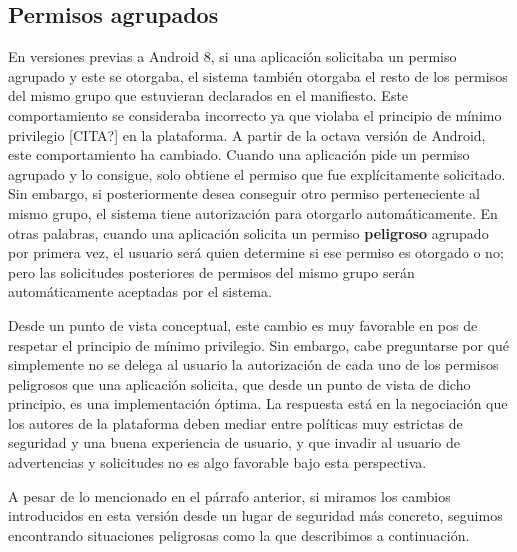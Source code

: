 \subsection{Permisos agrupados}
\label{subsection:recent-changes:grouped-permissions}
En versiones previas a Android 8, si una aplicación solicitaba un permiso agrupado y este se otorgaba, el
sistema también otorgaba el resto de los permisos del mismo grupo que estuvieran declarados en el
manifiesto. Este comportamiento se consideraba incorrecto ya que violaba el principio de mínimo
privilegio [CITA?] en la plataforma. A partir de la octava versión de Android, este comportamiento ha
cambiado. Cuando una aplicación pide un permiso agrupado y lo consigue, solo obtiene el permiso que fue
explícitamente solicitado. Sin embargo, si posteriormente desea conseguir otro permiso perteneciente al
mismo grupo, el sistema tiene autorización para otorgarlo automáticamente. En otras palabras, cuando una
aplicación solicita un permiso \textbf{peligroso} agrupado por primera vez, el usuario será quien
determine si ese permiso es otorgado o no; pero las solicitudes posteriores de permisos del mismo grupo
serán automáticamente aceptadas por el sistema.

Desde un punto de vista conceptual, este cambio es muy favorable en pos de respetar el principio de
mínimo privilegio. Sin embargo, cabe preguntarse por qué simplemente no se delega al usuario la
autorización de cada uno de los permisos peligrosos que una aplicación solicita, que desde un punto de
vista de dicho principio, es una implementación óptima. La respuesta está en la negociación que los
autores de la plataforma deben mediar entre políticas muy estrictas de seguridad y una buena experiencia
de usuario, y que invadir al usuario de advertencias y solicitudes no es algo favorable bajo esta
perspectiva.

A pesar de lo mencionado en el párrafo anterior, si miramos los cambios introducidos en esta versión
desde un lugar de seguridad más concreto, seguimos encontrando situaciones peligrosas como la que
describimos a continuación.


